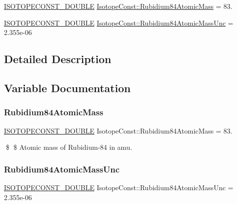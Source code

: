\begin{DoxyCompactItemize}
\item 
\mbox{\hyperlink{group___isotope_const-_macros_ga8f45a7272ce02c0b4c65c44636ed719a}{I\+S\+O\+T\+O\+P\+E\+C\+O\+N\+S\+T\+\_\+\+D\+O\+U\+B\+LE}} \mbox{\hyperlink{group___isotope_const-_rubidium-_rb84_ga1fb4a06a359abe1d429cbdccb368287f}{Isotope\+Const\+::\+Rubidium84\+Atomic\+Mass}} = 83.
\item 
\mbox{\hyperlink{group___isotope_const-_macros_ga8f45a7272ce02c0b4c65c44636ed719a}{I\+S\+O\+T\+O\+P\+E\+C\+O\+N\+S\+T\+\_\+\+D\+O\+U\+B\+LE}} \mbox{\hyperlink{group___isotope_const-_rubidium-_rb84_ga9f70d90e6db3925cefd9d1220b59b048}{Isotope\+Const\+::\+Rubidium84\+Atomic\+Mass\+Unc}} = 2.\+355e-\/06
\end{DoxyCompactItemize}


\subsection{Detailed Description}


\subsection{Variable Documentation}
\mbox{\label{group___isotope_const-_rubidium-_rb84_ga1fb4a06a359abe1d429cbdccb368287f}} 
\subsubsection{\texorpdfstring{Rubidium84\+Atomic\+Mass}{Rubidium84AtomicMass}}
{\footnotesize\ttfamily \mbox{\hyperlink{group___isotope_const-_macros_ga8f45a7272ce02c0b4c65c44636ed719a}{I\+S\+O\+T\+O\+P\+E\+C\+O\+N\+S\+T\+\_\+\+D\+O\+U\+B\+LE}} Isotope\+Const\+::\+Rubidium84\+Atomic\+Mass = 83.}

\$ \$ Atomic mass of Rubidium-\/84 in amu. \mbox{\label{group___isotope_const-_rubidium-_rb84_ga9f70d90e6db3925cefd9d1220b59b048}} 
\subsubsection{\texorpdfstring{Rubidium84\+Atomic\+Mass\+Unc}{Rubidium84AtomicMassUnc}}
{\footnotesize\ttfamily \mbox{\hyperlink{group___isotope_const-_macros_ga8f45a7272ce02c0b4c65c44636ed719a}{I\+S\+O\+T\+O\+P\+E\+C\+O\+N\+S\+T\+\_\+\+D\+O\+U\+B\+LE}} Isotope\+Const\+::\+Rubidium84\+Atomic\+Mass\+Unc = 2.\+355e-\/06}

